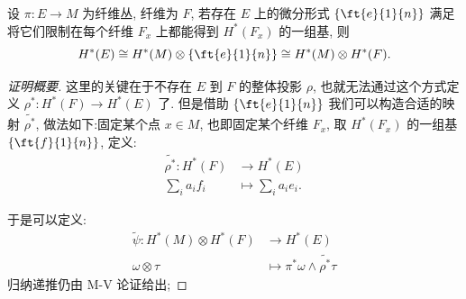     \begin{theorem}
        设 $\pi:E\rightarrow M$ 为纤维丛, 纤维为 $F$, 
        若存在 $E$ 上的微分形式 $\{\ft{e}{1}{n}\}$ 满足将它们限制在每个纤维 
        $F_x$ 上都能得到 $H^*(F_x)$ 的一组基, 
        则
        \begin{equation*}
            H^*(E)\cong H^*(M)\otimes\{\ft{e}{1}{n}\}
            \cong H^*(M)\otimes H^*(F).
        \end{equation*}
    \end{theorem}
    \begin{proof}[证明概要]
        这里的关键在于不存在 $E$ 到 $F$ 的整体投影 $\rho$, 
        也就无法通过这个方式定义 $\rho^*:H^*(F)\rightarrow H^*(E)$ 了. 
        但是借助 $\{\ft{e}{1}{n}\}$ 我们可以构造合适的映射 $\tilde{\rho^*}$, 
        做法如下:固定某个点 $x\in M$, 也即固定某个纤维 $F_x$, 
        取 $H^*(F_x)$ 的一组基 $\{\ft{f}{1}{n}\}$, 定义:
        \begin{align*}
            \tilde{\rho^*}:H^*(F)&\rightarrow H^*(E) \\
            \sum_{i}a_if_i&\mapsto\sum_{i}a_ie_i.
        \end{align*} 

        于是可以定义:
        \begin{align*}
            \tilde{\psi}:H^*(M)\otimes H^*(F)&\rightarrow H^*(E) \\
            \omega\otimes\tau&\mapsto\pi^*\omega\wedge\tilde{\rho^*}\tau
        \end{align*}
        归纳递推仍由 M-V 论证给出; 
        
        

\end{proof}
